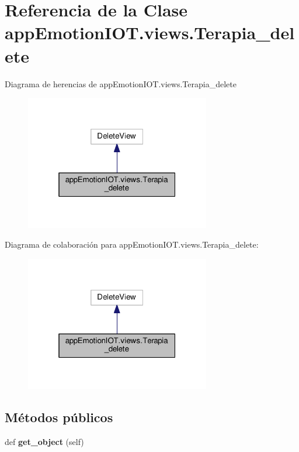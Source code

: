 \hypertarget{classappEmotionIOT_1_1views_1_1Terapia__delete}{}\section{Referencia de la Clase app\+Emotion\+I\+O\+T.\+views.\+Terapia\+\_\+delete}
\label{classappEmotionIOT_1_1views_1_1Terapia__delete}


Diagrama de herencias de app\+Emotion\+I\+O\+T.\+views.\+Terapia\+\_\+delete
\nopagebreak
\begin{figure}[H]
\begin{center}
\leavevmode
\includegraphics[width=229pt]{classappEmotionIOT_1_1views_1_1Terapia__delete__inherit__graph}
\end{center}
\end{figure}


Diagrama de colaboración para app\+Emotion\+I\+O\+T.\+views.\+Terapia\+\_\+delete\+:
\nopagebreak
\begin{figure}[H]
\begin{center}
\leavevmode
\includegraphics[width=229pt]{classappEmotionIOT_1_1views_1_1Terapia__delete__coll__graph}
\end{center}
\end{figure}
\subsection*{Métodos públicos}
\begin{DoxyCompactItemize}
\item 
def {\bfseries get\+\_\+object} (self)\hypertarget{classappEmotionIOT_1_1views_1_1Terapia__delete_a6db5610bb751660706e245ac93ad67c5}{}\label{classappEmotionIOT_1_1views_1_1Terapia__delete_a6db5610bb751660706e245ac93ad67c5}

\end{DoxyCompactItemize}
